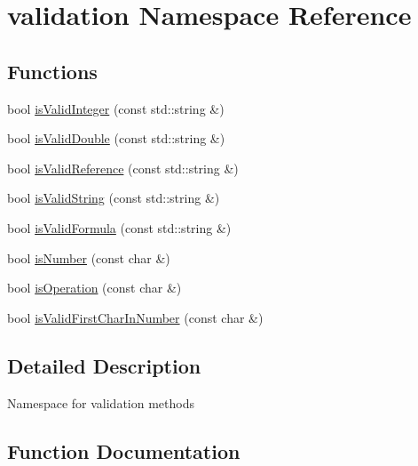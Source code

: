 \hypertarget{namespacevalidation}{}\section{validation Namespace Reference}
\label{namespacevalidation}
\subsection*{Functions}
\begin{DoxyCompactItemize}
\item 
bool \hyperlink{namespacevalidation_a79d16e6b2fb9f26b308ba873d5c1f4ba}{is\+Valid\+Integer} (const std\+::string \&)
\item 
bool \hyperlink{namespacevalidation_ac6510b1b11ad2a41bdacf9164db9171a}{is\+Valid\+Double} (const std\+::string \&)
\item 
bool \hyperlink{namespacevalidation_a41c7f7672cfab0b1386e64e9c30aae72}{is\+Valid\+Reference} (const std\+::string \&)
\item 
bool \hyperlink{namespacevalidation_a651f07800d4dfd07e28ea5b6fb988bf6}{is\+Valid\+String} (const std\+::string \&)
\item 
bool \hyperlink{namespacevalidation_a3a4eed4024e7f1c319fe999751026392}{is\+Valid\+Formula} (const std\+::string \&)
\item 
bool \hyperlink{namespacevalidation_a3ee8771a2538dfb539ddde16854b8674}{is\+Number} (const char \&)
\item 
bool \hyperlink{namespacevalidation_ac9fec2335861325c9e7c0c7b5a2f868d}{is\+Operation} (const char \&)
\item 
bool \hyperlink{namespacevalidation_acc02b07e5822ad974d205771eddf50b5}{is\+Valid\+First\+Char\+In\+Number} (const char \&)
\end{DoxyCompactItemize}


\subsection{Detailed Description}
Namespace for validation methods 

\subsection{Function Documentation}
\mbox{\label{namespacevalidation_a3ee8771a2538dfb539ddde16854b8674}} 
